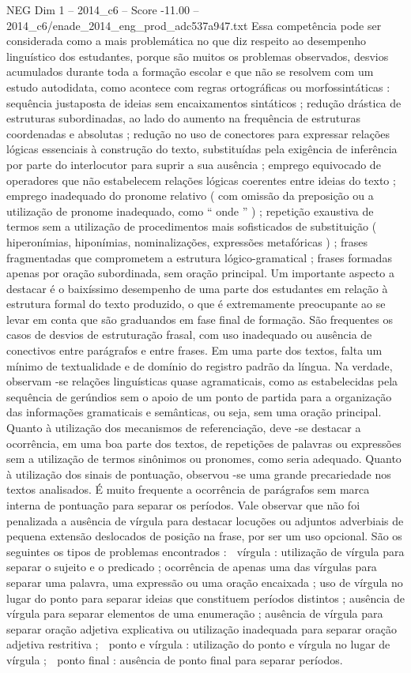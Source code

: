 \begin{textsample}{NEG Dim 1 – 2014\_c6 – Score -11.00 – 2014\_c6/enade\_2014\_eng\_prod\_adc537a947.txt}
Essa competência pode ser considerada como a mais problemática no que diz respeito ao desempenho linguístico dos estudantes, porque são muitos os problemas observados, desvios acumulados durante toda a formação escolar e que não se resolvem com um estudo autodidata, como acontece com regras ortográficas ou morfossintáticas : sequência justaposta de ideias sem encaixamentos sintáticos ; redução drástica de estruturas subordinadas, ao lado do aumento na frequência de estruturas coordenadas e absolutas ; redução no uso de conectores para expressar relações lógicas essenciais à construção do texto, substituídas pela exigência de inferência por parte do interlocutor para suprir a sua ausência ; emprego equivocado de operadores que não estabelecem relações lógicas coerentes entre ideias do texto ; emprego inadequado do pronome relativo ( com omissão da preposição ou a utilização de pronome inadequado, como “ onde ” ) ; repetição exaustiva de termos sem a utilização de procedimentos mais sofisticados de substituição ( hiperonímias, hiponímias, nominalizações, expressões metafóricas ) ; frases fragmentadas que comprometem a estrutura lógico-gramatical ; frases formadas apenas por oração subordinada, sem oração principal.
Um importante aspecto a destacar é o baixíssimo desempenho de uma parte dos estudantes em relação à estrutura formal do texto produzido, o que é extremamente preocupante ao se levar em conta que são graduandos em fase final de formação.
São frequentes os casos de desvios de estruturação frasal, com uso inadequado ou ausência de conectivos entre parágrafos e entre frases.
Em uma parte dos textos, falta um mínimo de textualidade e de domínio do registro padrão da língua.
Na verdade, observam -se relações linguísticas quase agramaticais, como as estabelecidas pela sequência de gerúndios sem o apoio de um ponto de partida para a organização das informações gramaticais e semânticas, ou seja, sem uma oração principal.
Quanto à utilização dos mecanismos de referenciação, deve -se destacar a ocorrência, em uma boa parte dos textos, de repetições de palavras ou expressões sem a utilização de termos sinônimos ou pronomes, como seria adequado.
Quanto à utilização dos sinais de pontuação, observou -se uma grande precariedade nos textos analisados.
É muito frequente a ocorrência de parágrafos sem marca interna de pontuação para separar os períodos.
Vale observar que não foi penalizada a ausência de vírgula para destacar locuções ou adjuntos adverbiais de pequena extensão deslocados de posição na frase, por ser um uso opcional.
São os seguintes os tipos de problemas encontrados :  vírgula : utilização de vírgula para separar o sujeito e o predicado ; ocorrência de apenas uma das vírgulas para separar uma palavra, uma expressão ou uma oração encaixada ; uso de vírgula no lugar do ponto para separar ideias que constituem períodos distintos ; ausência de vírgula para separar elementos de uma enumeração ; ausência de vírgula para separar oração adjetiva explicativa ou utilização inadequada para separar oração adjetiva restritiva ;  ponto e vírgula : utilização do ponto e vírgula no lugar de vírgula ;  ponto final : ausência de ponto final para separar períodos.

\end{textsample}
